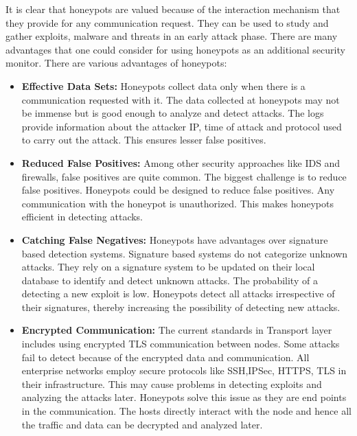 \documentclass[article,msc=informatik,type=msc,colorback,accentcolor=tud9c]{tudthesis}
\begin{document}
	\vspace{3mm} 
	It is clear that honeypots are valued because of the interaction mechanism that they provide for any communication request. They can be used to study and gather exploits, malware and threats in an early attack phase. There are many advantages that one could consider for using honeypots as an additional security monitor. There are various advantages of honeypots:

	\begin{itemize}

	\item\textbf {Effective Data Sets:} Honeypots collect data only when there is a communication requested with it. The data collected at honeypots may not be immense but is good enough to analyze and detect attacks. The logs provide information about the attacker \ac{IP}, time of attack and protocol used to carry out the attack. This ensures lesser false positives.

	\item\textbf {Reduced False Positives:} Among other security approaches like IDS and firewalls, false positives are quite common. The biggest challenge is to reduce false positives. Honeypots  could be designed to reduce false positives. Any communication with the honeypot is unauthorized. This makes honeypots efficient in detecting attacks.

	\item\textbf {Catching False Negatives:} Honeypots have advantages over signature based detection systems. Signature based systems do not categorize unknown attacks. They rely on a signature system to be updated on their local database to identify and detect unknown attacks. The probability of a detecting a new exploit is low. Honeypots detect all attacks irrespective of their signatures, thereby increasing the possibility of detecting new attacks. 

	\item\textbf {Encrypted Communication:} The current standards in Transport layer includes using encrypted \ac{TLS} communication between nodes. Some attacks fail to detect because of the encrypted data and communication. All enterprise networks employ secure protocols like \ac{SSH},\ac{IPSec}, \ac{HTTPS}, \ac{TLS} in their infrastructure. This may cause problems in detecting exploits and analyzing the attacks later. Honeypots solve this issue as they are end points in the communication. The hosts directly interact with the node and hence all the traffic and data can be decrypted and analyzed later.


\end{itemize}
\end{document}
